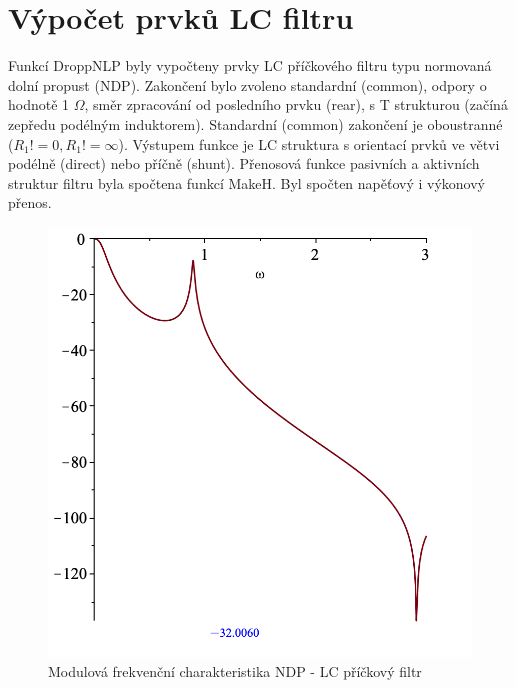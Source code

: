 \documentclass[twoside]{article}
\begin{document}
\section{Výpočet prvků LC filtru}
\noindent Funkcí DroppNLP byly vypočteny prvky LC příčkového filtru typu normovaná dolní propust (NDP). Zakončení bylo zvoleno standardní (common), odpory o hodnotě 1 $\Omega$, směr zpracování od posledního prvku (rear), s T strukturou (začíná zepředu podélným induktorem). Standardní (common) zakončení je oboustranné ($R_1 != 0, R_1 != \infty$). Výstupem funkce je LC struktura s orientací prvků ve větvi podélně (direct) nebo příčně (shunt).
\noindent Přenosová funkce pasivních a aktivních struktur filtru byla spočtena funkcí MakeH. Byl spočten  napěťový i výkonový přenos.
\begin{figure}[H]
\centering
\includegraphics[scale=0.5]{sch2.png}
\caption{Modulová frekvenční charakteristika NDP - LC příčkový filtr}
\end{figure}
\end{document}
